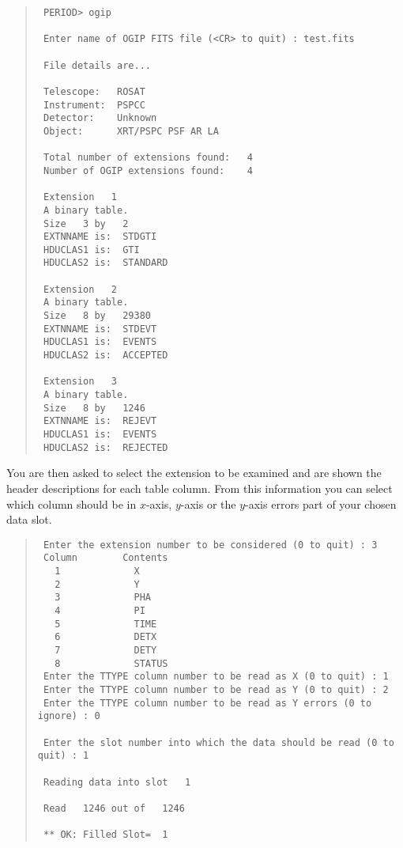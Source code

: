 \begin{quote}
\begin{verbatim}
 PERIOD> ogip
  
 Enter name of OGIP FITS file (<CR> to quit) : test.fits
  
 File details are...
  
 Telescope:   ROSAT                                 
 Instrument:  PSPCC                                 
 Detector:    Unknown                                 
 Object:      XRT/PSPC PSF AR LA                    
  
 Total number of extensions found:   4
 Number of OGIP extensions found:    4
  
 Extension   1
 A binary table.     
 Size   3 by   2
 EXTNNAME is:  STDGTI                                
 HDUCLAS1 is:  GTI                                   
 HDUCLAS2 is:  STANDARD                               
  
 Extension   2
 A binary table.     
 Size   8 by   29380
 EXTNNAME is:  STDEVT                                
 HDUCLAS1 is:  EVENTS                                
 HDUCLAS2 is:  ACCEPTED                               
  
 Extension   3
 A binary table.     
 Size   8 by   1246
 EXTNNAME is:  REJEVT                                
 HDUCLAS1 is:  EVENTS                                
 HDUCLAS2 is:  REJECTED                               
\end{verbatim}
\end{quote}

You are then asked to select the extension to be examined and are shown
the header descriptions for each table column. From this information
you can select which column should be in $x$-axis, $y$-axis or the 
$y$-axis errors part of your chosen data slot.
 
\begin{quote}
\begin{verbatim}
 Enter the extension number to be considered (0 to quit) : 3
 Column        Contents 
   1             X         
   2             Y         
   3             PHA       
   4             PI        
   5             TIME      
   6             DETX      
   7             DETY      
   8             STATUS    
 Enter the TTYPE column number to be read as X (0 to quit) : 1
 Enter the TTYPE column number to be read as Y (0 to quit) : 2
 Enter the TTYPE column number to be read as Y errors (0 to ignore) : 0
  
 Enter the slot number into which the data should be read (0 to quit) : 1
 
 Reading data into slot   1
  
 Read   1246 out of   1246
  
 ** OK: Filled Slot=  1
\end{verbatim}
\end{quote}

